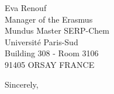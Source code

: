 \documentclass[11pt, a4paper]{letter} %
\begin{document}
\begin{letter}{

Eva Renouf \\
Manager of the Erasmus \\ \hspace{0.1 cm} Mundus Master SERP-Chem \\
Université Paris-Sud \\
Building 308 - Room 3106 \\
91405 ORSAY FRANCE \\
}
\closing{Sincerely,}




\end{letter}

\newpage
\end{document}
